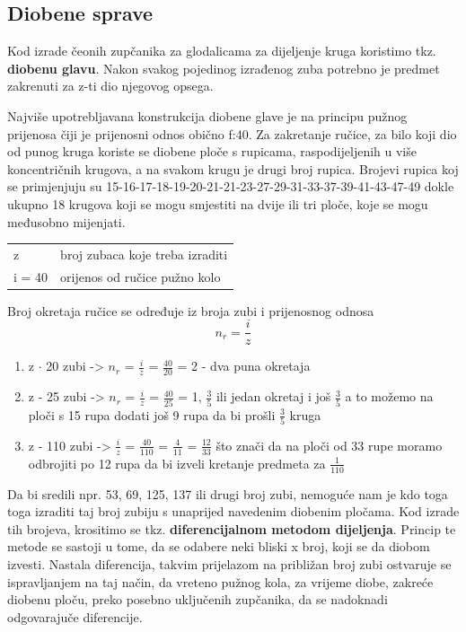 \documentclass[a4paper,12pt]{article}
\numberwithin{figure}{section}
\begin{document}
\subsection{Diobene sprave}
Kod izrade čeonih zupčanika za glodalicama za dijeljenje kruga koristimo tkz. \textbf{diobenu glavu}. Nakon svakog pojedinog izrađenog zuba potrebno je predmet zakrenuti za z-ti dio njegovog opsega.\par
Najviše upotrebljavana konstrukcija diobene glave je na principu pužnog prijenosa čiji je prijenosni odnos obično f:40. Za zakretanje ručice, za bilo koji dio od punog kruga koriste se diobene ploče s rupicama, raspodijeljenih u više koncentričnih krugova, a na svakom krugu je drugi broj rupica. Brojevi rupica koj se primjenjuju su 15-16-17-18-19-20-21-21-23-27-29-31-33-37-39-41-43-47-49 dokle ukupno 18 krugova koji se mogu smjestiti na dvije ili tri ploče, koje se mogu međusobno mijenjati.
\begin{table}[]
\centering
\begin{tabular}{ll}
z      & broj zubaca koje treba izraditi \\
i = 40 & orijenos od ručice pužno kolo  
\end{tabular}
\end{table}
\FloatBarrier
Broj okretaja ručice se određuje iz broja zubi i prijenosnog odnosa
\begin{equation}
n_{r} = \frac{i}{z}
\end{equation}
\begin{enumerate}
\item z $\cdot$ 20 zubi -> $\displaystyle{n_{r}}$ = $\displaystyle{\frac{i}{z}}$ = $\displaystyle{\frac{40}{20}}$ = 2 - dva puna okretaja
\item z - 25 zubi -> $n_{r}$ = $\displaystyle{\frac{i}{z}}$ = $\displaystyle{\frac{40}{25}}$ = 1, $\displaystyle{\frac{3}{5}}$ ili jedan okretaj i još $\displaystyle{\frac{3}{5}}$ a to možemo na ploči s 15 rupa dodati još 9 rupa da bi prošli $\displaystyle{\frac{3}{5}}$ kruga
\item z - 110 zubi -> $\displaystyle{\frac{i}{z}}$ = $\displaystyle{\frac{40}{110}}$ = $\displaystyle{\frac{4}{11}}$ = $\displaystyle{\frac{12}{33}}$ što znači da na ploči od 33 rupe moramo odbrojiti po 12 rupa da bi izveli kretanje predmeta za $\displaystyle{\frac{1}{110}}$
\end{enumerate}
Da bi sredili npr. 53, 69, 125, 137 ili drugi broj zubi, nemoguće nam je kdo toga toga izraditi taj broj zubiju s unaprijed navedenim diobenim pločama. Kod izrade tih brojeva, krositimo se tkz. \textbf{diferencijalnom metodom dijeljenja}. Princip te metode se sastoji u tome, da se odabere neki bliski x broj, koji se da diobom izvesti. Nastala diferencija, takvim prijelazom na približan broj zubi ostvaruje se ispravljanjem na taj način, da vreteno pužnog kola, za vrijeme diobe, zakreće diobenu ploču, preko posebno uključenih zupčanika, da se nadoknadi odgovarajuče diferencije.
\end{document}
